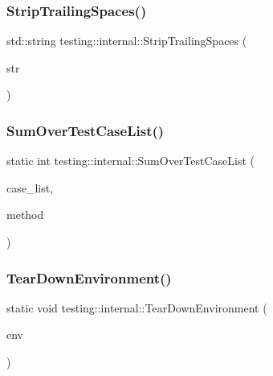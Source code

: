 \mbox{\label{namespacetesting_1_1internal_aa6afda12e567c353e2e9b9c2e8cae14f}} 
\subsubsection{\texorpdfstring{StripTrailingSpaces()}{StripTrailingSpaces()}}
{\footnotesize\ttfamily std\+::string testing\+::internal\+::\+Strip\+Trailing\+Spaces (\begin{DoxyParamCaption}\item[{std\+::string}]{str }\end{DoxyParamCaption})\hspace{0.3cm}{\ttfamily [inline]}}

\mbox{\label{namespacetesting_1_1internal_ad1b758141e7e064d00a2bf0355c8ee43}} 
\subsubsection{\texorpdfstring{SumOverTestCaseList()}{SumOverTestCaseList()}}
{\footnotesize\ttfamily static int testing\+::internal\+::\+Sum\+Over\+Test\+Case\+List (\begin{DoxyParamCaption}\item[{const std\+::vector$<$ \mbox{\hyperlink{classtesting_1_1TestCase}{Test\+Case}} $\ast$ $>$ \&}]{case\+\_\+list,  }\item[{int(Test\+Case\+::$\ast$)() const}]{method }\end{DoxyParamCaption})\hspace{0.3cm}{\ttfamily [static]}}

\mbox{\label{namespacetesting_1_1internal_ac467e871e4781da3f5ebed2a4465aec4}} 
\subsubsection{\texorpdfstring{TearDownEnvironment()}{TearDownEnvironment()}}
{\footnotesize\ttfamily static void testing\+::internal\+::\+Tear\+Down\+Environment (\begin{DoxyParamCaption}\item[{\mbox{\hyperlink{classtesting_1_1Environment}{Environment}} $\ast$}]{env }\end{DoxyParamCaption})\hspace{0.3cm}{\ttfamily [static]}}

